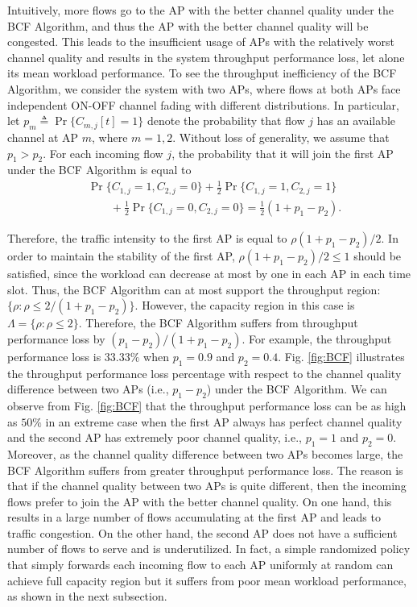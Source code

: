 \documentclass[10pt, conference, letterpaper]{IEEEtran} %
\begin{document}
Intuitively, more flows go to the AP with the better channel quality under the BCF Algorithm, and thus the AP with the better channel quality will be congested. This leads to the insufficient usage of APs with the relatively worst channel quality and results in the system throughput performance loss, let alone its mean workload performance. To see the throughput inefficiency of the BCF Algorithm, we consider the system with two APs, where flows at both APs face independent ON-OFF channel fading with different distributions. In particular, let $p_{m}\triangleq\Pr\{C_{m,j}[t]=1\}$ denote the probability that flow $j$ has an available channel at AP $m$, where $m=1,2$. Without loss of generality, we assume that $p_1>p_2$. For each incoming flow $j$, the probability that it will join the first AP under the BCF Algorithm is equal to 
\begin{align}
&\Pr\{C_{1,j}=1,C_{2,j}=0\}+\frac{1}{2}\Pr\{C_{1,j}=1,C_{2,j}=1\}\nonumber\\
&\qquad+\frac{1}{2}\Pr\{C_{1,j}=0,C_{2,j}=0\}=\frac{1}{2}(1+p_1-p_2).
\end{align}

Therefore, the traffic intensity to the first AP is equal to $\rho(1+p_1-p_2)/2$. In order to maintain the stability of the first AP, $\rho(1+p_1-p_2)/2\leq 1$ should be satisfied, since the workload can decrease at most by one in each AP in each time slot. Thus, the BCF Algorithm can at most support the throughput region: $\{\rho: \rho\leq 2/(1+p_1-p_2)\}$. However, the capacity region in this case is $\Lambda=\{\rho:\rho\leq 2\}$. Therefore, the BCF Algorithm suffers from throughput performance loss by $(p_1-p_2)/(1+p_1-p_2)$. For example, the throughput performance loss is $33.33\%$ when $p_1=0.9$ and $p_2=0.4$. Fig. \ref{fig:BCF} illustrates the throughput performance loss percentage with respect to the channel quality difference between two APs (i.e., $p_1-p_2$) under the BCF Algorithm. We can observe from Fig. \ref{fig:BCF} that the throughput performance loss can be as high as $50\%$ in an extreme case when the first AP always has perfect channel quality and the second AP has extremely poor channel quality, i.e., $p_1=1$ and $p_2=0$. Moreover, as the channel quality difference between two APs becomes large, the BCF Algorithm suffers from greater throughput performance loss. The reason is that if the channel quality between two APs is quite different, then the incoming flows prefer to join the AP with the better channel quality. On one hand, this results in a large number of flows accumulating at the first AP and leads to traffic congestion. On the other hand, the second AP does not have a sufficient number of flows to serve and is underutilized. In fact, a simple randomized policy that simply forwards each incoming flow to each AP uniformly at random can achieve full capacity region but it suffers from poor mean workload performance, as shown in the next subsection.
\end{document}
